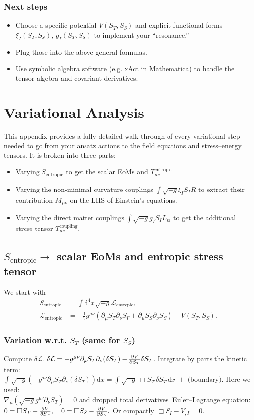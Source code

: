 \documentclass[11pt,a4paper]{article} %
\newcommand{\ST}{S_T}
\newcommand{\SSp}{S_S} %
\newcommand{\Sentropic}{S_{\text{entropic}}}
\newcommand{\Lm}{L_m}
\newcommand{\Tmu}{T} %
\newcommand{\Mmu}{M} %
\newcommand{\Tmnentropic}{T^{\text{entropic}}_{\mu\nu}}
\newcommand{\Adx}{\text{d}x} %
\begin{document}
\subsubsection{Next steps}
\begin{itemize}
    \item Choose a specific potential $V(\ST,\SSp)$ and explicit functional forms $\xi_I(\ST,\SSp)$, $g_I(\ST,\SSp)$ to implement your ``resonance.''
    \item Plug those into the above general formulas.
    \item Use symbolic algebra software (e.g. xAct in Mathematica) to handle the tensor algebra and covariant derivatives.
\end{itemize}

\section{Variational Analysis}
\label{app:B}
This appendix provides a fully detailed walk-through of every variational step needed to go from your ansatz actions to the field equations and stress–energy tensors. It is broken into three parts:
\begin{itemize}
    \item Varying $\Sentropic$ to get the scalar EoMs and $\Tmnentropic$
    \item Varying the non-minimal curvature couplings $\int\sqrt{-g}\xi_I S_I R$ to extract their contribution $\Mmu_{\mu\nu}$ on the LHS of Einstein's equations.
    \item Varying the direct matter couplings $\int\sqrt{-g}g_I S_I\Lm$ to get the additional stress tensor $\Tmu^{\text{coupling}}_{\mu\nu}$.
\end{itemize}

\subsection{$\Sentropic \to$ scalar EoMs and entropic stress tensor}
We start with
\begin{align*}
\Sentropic&=\int\text{d}^4x\sqrt{-g}\mathcal{L}_{\text{entropic}},\\
\mathcal{L}_{\text{entropic}}&=-\frac{1}{2}g^{\mu\nu}(\partial_\mu\ST\partial_\nu\ST+\partial_\mu\SSp\partial_\nu\SSp)-V(\ST,\SSp).
\end{align*}

\subsubsection{Variation w.r.t. $\ST$ (same for $\SSp$)}
Compute $\delta\mathcal{L}$.
$\delta\mathcal{L}=-g^{\mu\nu}\partial_\mu\ST\partial_\nu(\delta\ST)-\pdv{V}{\ST}\delta\ST$.
Integrate by parts the kinetic term: \\
$\int\sqrt{-g}\left(-g^{\mu\nu}\partial_\mu\ST\partial_\nu(\delta\ST)\right)\Adx=\int\sqrt{-g}\,\Box\ST\,\delta\ST\,\Adx \;+\;\text{(boundary)}.$
Here we used: \\ $\nabla_\mu(\sqrt{-g}g^{\mu\nu}\partial_\nu\ST)=0$ and dropped total derivatives.
Euler–Lagrange equation:
$0=\Box\ST-\pdv{V}{\ST},\quad 0=\Box\SSp-\pdv{V}{\SSp}.$
Or compactly $\Box S_I-V_{,I}=0$.
\end{document}
